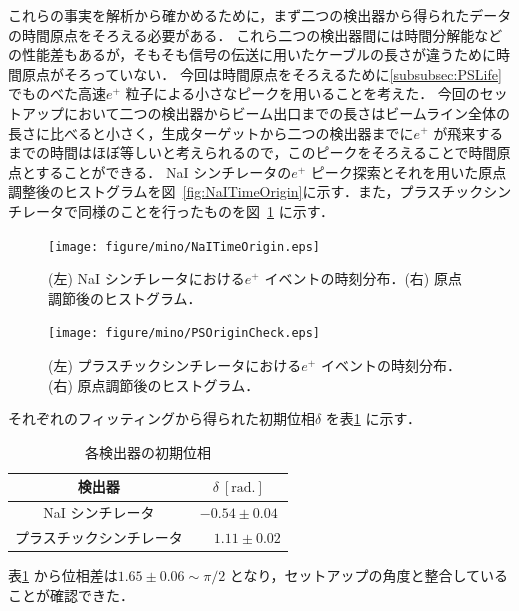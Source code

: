 これらの事実を解析から確かめるために，まず二つの検出器から得られたデータの時間原点をそろえる必要がある．
これら二つの検出器間には時間分解能などの性能差もあるが，そもそも信号の伝送に用いたケーブルの長さが違うために時間原点がそろっていない．
今回は時間原点をそろえるために\ref{subsubsec:PSLife} でものべた高速$e^{+}$ 粒子による小さなピークを用いることを考えた．
今回のセットアップにおいて二つの検出器からビーム出口までの長さはビームライン全体の長さに比べると小さく，生成ターゲットから二つの検出器までに$e^{+}$ が飛来するまでの時間はほぼ等しいと考えられるので，このピークをそろえることで時間原点とすることができる．
NaI シンチレータの$e^{+}$ ピーク探索とそれを用いた原点調整後のヒストグラムを図~\ref{fig:NaITimeOrigin}に示す．また，プラスチックシンチレータで同様のことを行ったものを図~\ref{fig:PSTimeOrigin} に示す．
\begin{figure}[h]
	\centering
	\texttt{[image: figure/mino/NaITimeOrigin.eps]}
	\caption{(左) NaI シンチレータにおける$e^{+}$ イベントの時刻分布．(右) 原点調節後のヒストグラム．}
	\label{fig:NaITimeOrigin}
	\texttt{[image: figure/mino/PSOriginCheck.eps]}
	\caption{(左) プラスチックシンチレータにおける$e^{+}$ イベントの時刻分布．(右) 原点調節後のヒストグラム．}
	\label{fig:PSTimeOrigin}
\end{figure}

それぞれのフィッティングから得られた初期位相$\delta$ を表\ref{tab:InitPhases} に示す．
\begin{table}[h]
	\centering
	\caption{各検出器の初期位相}
	\begin{tabular}{cc}\toprule
	検出器 & $\delta~[\mathrm{rad.}]$ \\ \midrule
	NaI シンチレータ & $-0.54 \pm 0.04$ \\
	プラスチックシンチレータ & $\phantom{-}1.11 \pm 0.02$ \\ \bottomrule
	\end{tabular}\label{tab:InitPhases}
\end{table}%
表\ref{tab:InitPhases} から位相差は$1.65 \pm 0.06 \sim \pi / 2$ となり，セットアップの角度と整合していることが確認できた．

%
